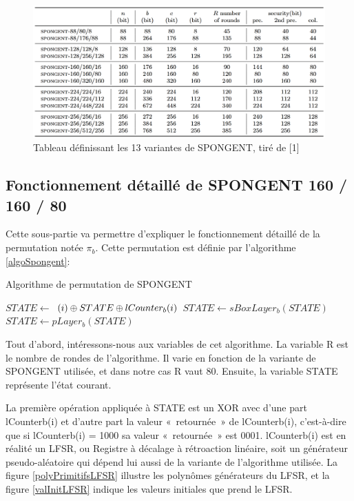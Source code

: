 		\begin{figure}[h]
			\centering
			\includegraphics[width=\textwidth]{imgs/Spongent/varianteSpongent.png}
			\caption{Tableau définissant  les 13 variantes de SPONGENT, tiré de [1]}
			\label{variantesSpongent}
   		\end{figure}

		\subsection{Fonctionnement détaillé de SPONGENT 160 / 160 / 80}
		Cette sous-partie va permettre d’expliquer le fonctionnement détaillé de la permutation notée $\pi_{b}$.
		Cette permutation est définie par l’algorithme \ref{algoSpongent}:
		\begin{algorithm}
			\caption{Algorithme de permutation de SPONGENT}
			\label{algoSpongent}
			\begin{algorithmic}
					\STATE $ STATE \leftarrow $ $(i) \mathbin{\oplus} STATE \mathbin{\oplus} lCounter_{b}(i)$
					\STATE $ STATE \leftarrow sBoxLayer_{b}(STATE)$
					\STATE $ STATE \leftarrow pLayer_{b}(STATE)$
				\ENDFOR
			\end{algorithmic}
		\end{algorithm}

		Tout d’abord, intéressons-nous aux variables de cet algorithme.
		La variable R est le nombre de rondes de l’algorithme. Il varie en fonction de la variante de SPONGENT utilisée, et dans notre cas R vaut 80.
		Ensuite, la variable STATE représente l’état courant.
		
		La première opération appliquée à STATE est un XOR avec d’une part lCounterb(i) et d’autre part la valeur « retournée » de lCounterb(i),
		c’est-à-dire que si lCounterb(i) = 1000 sa valeur « retournée » est 0001. lCounterb(i) est en réalité un LFSR, ou Registre à décalage à rétroaction linéaire,
		soit un générateur pseudo-aléatoire qui dépend lui aussi de la variante de l’algorithme utilisée.
		La figure \ref{polyPrimitifsLFSR} illustre les polynômes générateurs du LFSR, et la figure \ref{valInitLFSR} indique les valeurs initiales que prend le LFSR.

